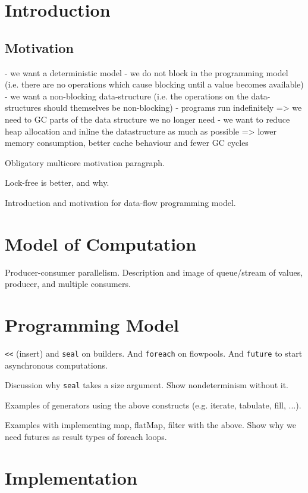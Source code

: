 \documentclass[runningheads,a4paper]{llncs}
\begin{document}
\section{Introduction}


\subsection{Motivation}

- we want a deterministic model
- we do not block in the programming model (i.e. there are no
operations which cause blocking until a value becomes available)
- we want a non-blocking data-structure (i.e. the operations on the
data-structures should themselves be non-blocking)
- programs run indefinitely => we need to GC parts of the
data structure we no longer need
- we want to reduce heap allocation and inline the datastructure as
much as possible => lower memory consumption, better cache behaviour
and fewer GC cycles


Obligatory multicore motivation paragraph.

Lock-free is better, and why.

Introduction and motivation for data-flow programming model.

\section{Model of Computation}
Producer-consumer parallelism. Description and image of queue/stream of values, producer, and multiple consumers. 

\section{Programming Model}
\texttt{<<} (insert) and \texttt{seal} on builders. And
\texttt{foreach} on flowpools.
And \texttt{future} to start asynchronous computations.

Discussion why \texttt{seal} takes a size argument. Show
nondeterminism without it.

Examples of generators using the above constructs (e.g. iterate,
tabulate, fill, ...).

Examples with implementing map, flatMap, filter with the above.
Show why we need futures as result types of foreach loops.

\section{Implementation}
\end{document}
